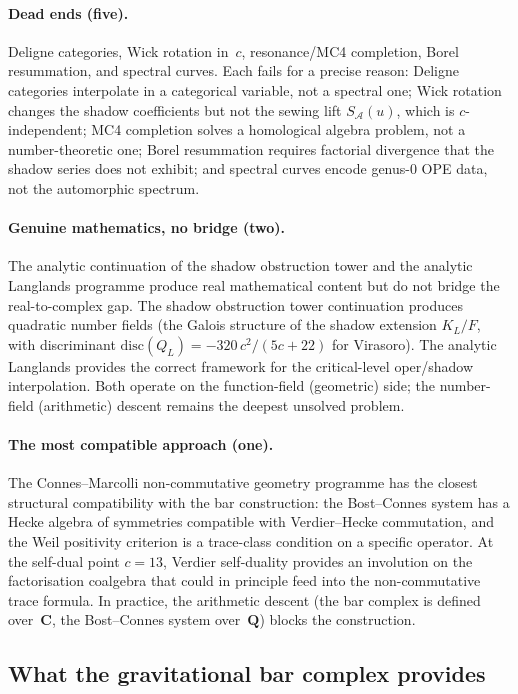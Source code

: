 \documentclass[11pt]{article}
\newcommand{\cA}{\mathcal{A}}
\begin{document}
\paragraph{Dead ends (five).}
Deligne categories, Wick rotation in~$c$, resonance/MC4
completion, Borel resummation, and spectral curves.
Each fails for a precise reason: Deligne categories
interpolate in a categorical variable, not a spectral one;
Wick rotation changes the shadow coefficients but not the
sewing lift $S_\cA(u)$, which is $c$-independent; MC4
completion solves a homological algebra problem, not a
number-theoretic one; Borel resummation requires factorial
divergence that the shadow series does not exhibit; and
spectral curves encode genus-$0$ OPE data, not the automorphic
spectrum.

\paragraph{Genuine mathematics, no bridge (two).}
The analytic continuation of the shadow obstruction tower and the analytic
Langlands programme produce real mathematical content but do
not bridge the real-to-complex gap.  The shadow obstruction tower
continuation produces quadratic number fields (the Galois
structure of the shadow extension $K_L/F$, with discriminant
$\mathrm{disc}(Q_L) = -320\,c^2/(5c{+}22)$ for Virasoro).
The analytic Langlands provides the correct framework for the
critical-level oper/shadow interpolation.  Both operate on the
function-field (geometric) side; the number-field (arithmetic)
descent remains the deepest unsolved problem.

\paragraph{The most compatible approach (one).}
The Connes--Marcolli non-commutative geometry programme has the
closest structural compatibility with the bar construction: the
Bost--Connes system has a Hecke algebra of symmetries
compatible with Verdier--Hecke commutation, and the Weil
positivity criterion is a trace-class condition on a specific
operator.  At the self-dual point $c = 13$, Verdier
self-duality provides an involution on the factorisation
coalgebra that could in principle feed into the non-commutative
trace formula.  In practice, the arithmetic descent (the bar
complex is defined over~$\mathbf{C}$, the Bost--Connes system
over~$\mathbf{Q}$) blocks the construction.

\subsection{What the gravitational bar complex provides}
\end{document}
